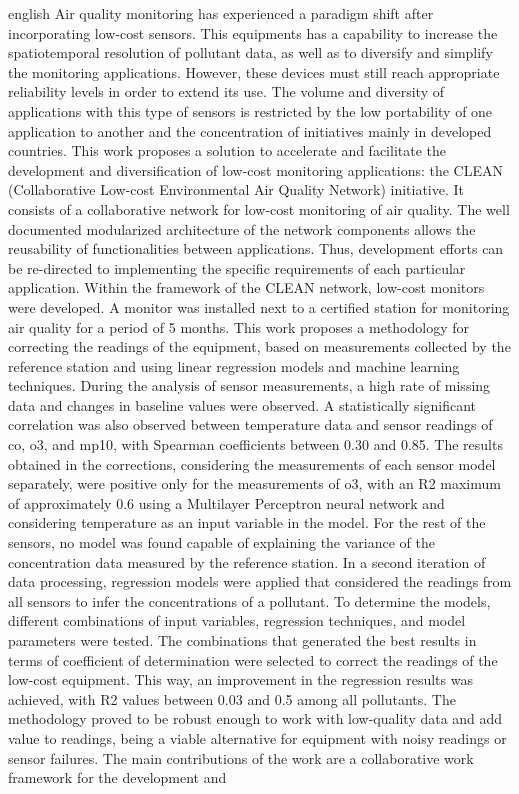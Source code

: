 \begin{resumo}[Abstract]
	\SingleSpacing
	\begin{otherlanguage*}{english}
		Air quality monitoring has experienced a paradigm shift after incorporating  low-cost sensors. This equipments has a capability to increase the spatiotemporal resolution of pollutant data, as well as to diversify and simplify the monitoring applications. However, these devices must still reach appropriate reliability levels in order to extend its use. The volume and diversity of applications with this type of sensors is restricted by the low portability of one application to another and the concentration of initiatives mainly in developed countries. This work proposes a solution to accelerate and facilitate the development and diversification of low-cost monitoring applications: the CLEAN (Collaborative Low-cost Environmental Air Quality Network) initiative. It consists of a collaborative network for low-cost monitoring of air quality. The well documented modularized architecture of the network components allows the reusability of functionalities between applications. Thus, development efforts can be re-directed to implementing the specific requirements of each particular application. Within the framework of the CLEAN network, low-cost monitors were developed. A monitor was installed next to a certified station for monitoring air quality for a period of 5 months. This work proposes a methodology for correcting the readings of the equipment, based on measurements collected by the reference station and using linear regression models and machine learning techniques. During the analysis of sensor measurements, a high rate of missing data and changes in baseline values were observed. A statistically significant correlation was also observed between temperature data and sensor readings of \acrshort{co}, \acrshort{o3}, and \acrshort{mp10}, with Spearman coefficients between 0.30 and 0.85. The results obtained in the corrections, considering the measurements of each sensor model separately, were positive only for the measurements of \acrshort{o3}, with an R2 maximum of approximately 0.6 using a Multilayer Perceptron neural network and considering temperature as an input variable in the model. For the rest of the sensors, no model was found capable of explaining the variance of the concentration data measured by the reference station. In a second iteration of data processing, regression models were applied that considered the readings from all sensors to infer the concentrations of a pollutant. To determine the models, different combinations of input variables, regression techniques, and model parameters were tested. The combinations that generated the best results in terms of coefficient of determination were selected to correct the readings of the low-cost equipment. This way, an improvement in the regression results was achieved, with R2 values between 0.03 and 0.5 among all pollutants. The methodology proved to be robust enough to work with low-quality data and add value to readings, being a viable alternative for equipment with noisy readings or sensor failures. The main contributions of the work are a collaborative work framework for the development and 
\end{otherlanguage*}
\end{resumo}
